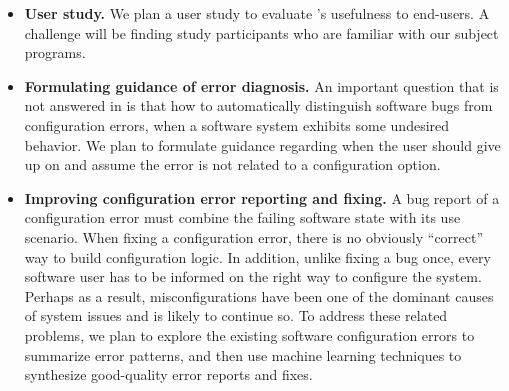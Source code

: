 \begin{itemize}
\item \textbf{User study.} We plan a user study to evaluate
\ourtool's usefulness to end-users. A challenge
will be finding study participants who are familiar
with our subject programs.

\item \textbf{Formulating guidance of error diagnosis.}
An important question that is not answered in \ourtool
is that how to automatically distinguish software bugs from 
configuration errors, when a software system exhibits
some undesired behavior. We plan to formulate guidance
regarding when the user should give up on \ourtool
and assume the error is not related to a configuration option.

\item \textbf{Improving configuration error reporting and fixing.}
A bug report of a configuration error must combine the
failing software state with its use scenario.
When fixing a configuration error, there is no obviously ``correct'' way to
build configuration logic. In addition, unlike fixing a bug once,
every software user has to be informed on the right way to
configure the system.  Perhaps as a result, misconfigurations
have been one of the dominant causes of system issues and
is likely to continue so. To address these related problems,
we plan to explore the existing software configuration errors
to summarize error patterns, and then use machine learning
techniques to synthesize good-quality error reports and fixes.



\end{itemize}

